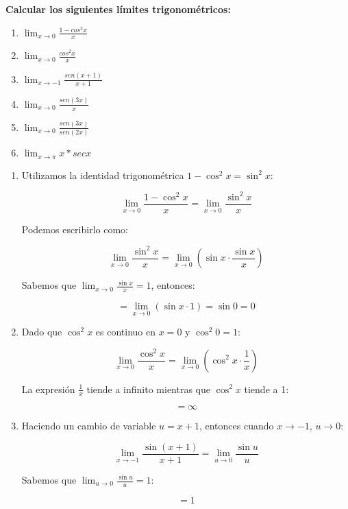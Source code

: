 \documentclass[answers]{exam} %
\begin{document}
\begin{questions}
	\question \large\textbf{Calcular los siguientes límites trigonométricos:}
	\begin{enumerate}[label=\alph*.]
		\item $\displaystyle \lim_{x\to{0}} \frac{1- cos^2 x}{x}$
		\item $\displaystyle \lim_{x\to{0}} \frac{cos^2 x}{x}$
		\item $\displaystyle \lim_{x\to{-1}} \frac{sen(x+1)}{x+1}$
		\item $\displaystyle \lim_{x\to{0}} \frac{sen(3x)}{x}$
		\item $\displaystyle \lim_{x\to{0}} \frac{sen(3x)}{sen(2x)}$
		\item $\displaystyle \lim_{x\to{\pi}} x * secx$
	\end{enumerate}
	\begin{solution}
		\begin{enumerate}[label=\alph*.]
			\item Utilizamos la identidad trigonométrica \(1 - \cos^2 x = \sin^2 x\):
	
			\[
			\lim_{x\to{0}} \frac{1-\cos^2 x}{x} = \lim_{x\to{0}} \frac{\sin^2 x}{x}
			\]
	
			Podemos escribirlo como:
	
			\[
			\lim_{x\to{0}} \frac{\sin^2 x}{x} = \lim_{x\to{0}} \left(\sin x \cdot \frac{\sin x}{x}\right)
			\]
	
			Sabemos que \(\lim_{x \to 0} \frac{\sin x}{x} = 1\), entonces:
	
			\[
			= \lim_{x\to{0}} (\sin x \cdot 1) = \sin 0 = 0
			\]
	
			\item Dado que \(\cos^2 x\) es continuo en \(x = 0\) y \(\cos^2 0 = 1\):
	
			\[
			\lim_{x\to{0}} \frac{\cos^2 x}{x} = \lim_{x\to{0}} \left(\cos^2 x \cdot \frac{1}{x}\right)
			\]
	
			La expresión \(\frac{1}{x}\) tiende a infinito mientras que \(\cos^2 x\) tiende a 1:
	
			\[
			= \infty
			\]
	
			\item Haciendo un cambio de variable \(u = x + 1\), entonces cuando \(x \to -1\), \(u \to 0\):
	
			\[
			\lim_{x\to{-1}} \frac{\sin(x+1)}{x+1} = \lim_{u\to{0}} \frac{\sin u}{u}
			\]
	
			Sabemos que \(\lim_{u \to 0} \frac{\sin u}{u} = 1\):
	
			\[
			= 1
			\]
	

\end{enumerate}
\end{solution}
\end{questions}
\end{document}
